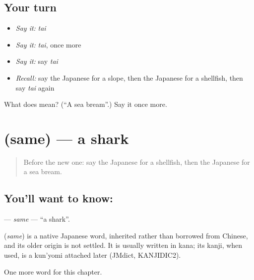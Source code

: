\subsection*{Your turn}
\begin{itemize}
\raggedright
  \item \emph{Say it:} \emph{tai}
  \item \emph{Say it:} \emph{tai}, once more
  \item \emph{Say it:} say \emph{tai}
  \item \emph{Recall:} say the Japanese for a slope, then the Japanese for a shellfish, then say \emph{tai} again
\end{itemize}

\begin{tcolorbox}[breakable,colback=teal!4,colframe=teal!35!black,title={Before you move on}]
What does  mean? (\textquotedblleft{}A sea bream\textquotedblright{}.) Say it once more.
\end{tcolorbox}
\section[\texorpdfstring{\ja{さめ} (same)}{さめ (same)}]{ (same) — a shark}

\label{lesson:JA-C108-same}



\begin{quote}
Before the new one: say the Japanese for a shellfish, then the Japanese for a sea bream.
\end{quote}

\subsection*{You'll want to know: }
\textbf{} — \emph{same} — \textquotedblleft{}a shark\textquotedblright{}.

\begin{cousinweb}
\textbf{} (\emph{same}) is a native Japanese word, inherited rather than borrowed from Chinese, and its older origin is not settled. It is usually written in kana; its kanji, when used, is a kun'yomi attached later (JMdict, KANJIDIC2).
\end{cousinweb}

\begin{grammarlens}[title={What you've built}]
One more word for this chapter.
\end{grammarlens}

